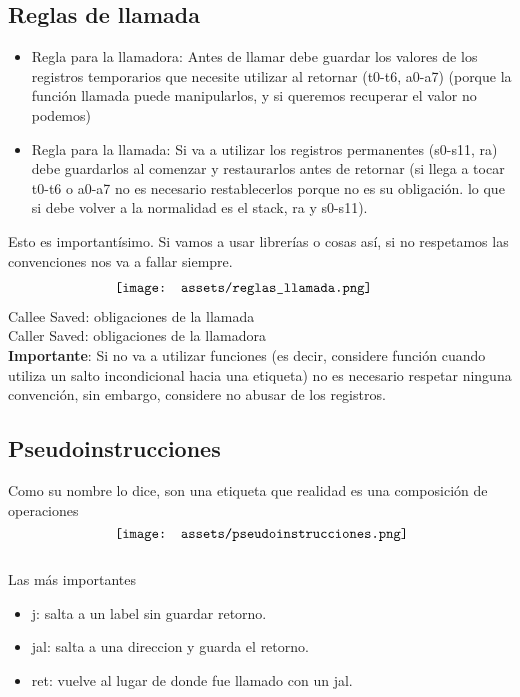 \documentclass[10pt,a4paper]{article}
\begin{document}
\subsection*{Reglas de llamada}
\begin{itemize}
    \item Regla para la llamadora: Antes de llamar debe guardar los valores de los registros temporarios que necesite utilizar al retornar (t0-t6, a0-a7) (porque la función llamada puede manipularlos, y si queremos recuperar el valor no podemos)
    \item Regla para la llamada: Si va a utilizar los registros permanentes (s0-s11, ra) debe guardarlos al comenzar y restaurarlos antes de retornar (si llega a tocar t0-t6 o a0-a7 no es necesario restablecerlos porque no es su obligación. lo que si debe volver a la normalidad es el stack, ra y s0-s11).
\end{itemize}
Esto es importantísimo. Si vamos a usar librerías o cosas así, si no respetamos las convenciones nos va a fallar siempre. \\
\[\begin{minipage}[b]{0.6\textwidth}
    \texttt{[image: assets/reglas\_llamada.png]}
    \label{fig:reglas_llamada}
\end{minipage}\]
Callee Saved: obligaciones de la llamada \\
Caller Saved: obligaciones de la llamadora \\
\textbf{Importante}: Si no va a utilizar funciones (es decir, considere función cuando utiliza un salto incondicional hacia una etiqueta) no es necesario respetar ninguna convención, sin embargo, considere no abusar de los registros.
\subsection*{Pseudoinstrucciones}
Como su nombre lo dice, son una etiqueta que realidad es una composición de operaciones \\
\[\begin{minipage}[b]{0.6\textwidth}
    \texttt{[image: assets/pseudoinstrucciones.png]}
    \label{fig:pseudoinstrucciones}
\end{minipage}\]
Las más importantes
\begin{itemize}
    \item j: salta a un label sin guardar retorno.
    \item jal: salta a una direccion y guarda el retorno.
    \item ret: vuelve al lugar de donde fue llamado con un jal. 
\end{itemize}
\end{document}
